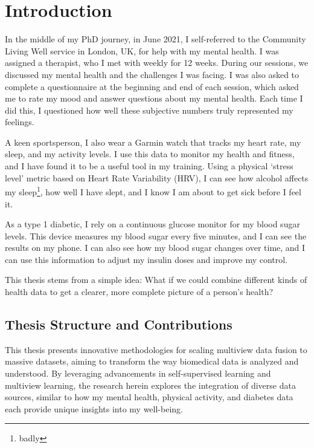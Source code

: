 \graphicspath{{chapters/introduction/}}
\chapter{Introduction}\label{chap:introduction}

In the middle of my PhD journey, in June 2021, I self-referred to the Community Living Well service in London, UK, for help with my mental health. I was assigned a therapist, who I met with weekly for 12 weeks. During our sessions, we discussed my mental health and the challenges I was facing. I was also asked to complete a questionnaire at the beginning and end of each session, which asked me to rate my mood and answer questions about my mental health. Each time I did this, I questioned how well these subjective numbers truly represented my feelings.

A keen sportsperson, I also wear a Garmin watch that tracks my heart rate, my sleep, and my activity levels. I use this data to monitor my health and fitness, and I have found it to be a useful tool in my training. Using a physical `stress level' metric based on Heart Rate Variability (HRV), I can see how alcohol affects my sleep\footnote{badly}, how well I have slept, and I know I am about to get sick before I feel it.

As a type 1 diabetic, I rely on a continuous glucose monitor for my blood sugar levels. This device measures my blood sugar every five minutes, and I can see the results on my phone. I can also see how my blood sugar changes over time, and I can use this information to adjust my insulin doses and improve my control.

This thesis stems from a simple idea: What if we could combine different kinds of health data to get a clearer, more complete picture of a person's health?

\section{Thesis Structure and Contributions}

This thesis presents innovative methodologies for scaling multiview data fusion to massive datasets, aiming to transform the way biomedical data is analyzed and understood. By leveraging advancements in self-supervised learning and multiview learning, the research herein explores the integration of diverse data sources, similar to how my mental health, physical activity, and diabetes data each provide unique insights into my well-being.

